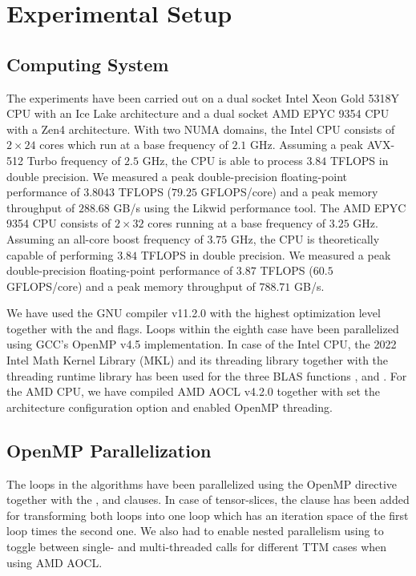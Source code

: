 \section{Experimental Setup}
\label{sec:experimental.setup}
\subsection{Computing System} 
The experiments have been carried out on a dual socket Intel Xeon Gold 5318Y CPU with an Ice Lake architecture and a dual socket AMD EPYC 9354 CPU with a Zen4 architecture.
With two NUMA domains, the Intel CPU consists of $2\times24$ cores which run at a base frequency of $2.1$ GHz.
Assuming a peak AVX-512 Turbo frequency of $2.5$ GHz, the CPU is able to process $3.84$ TFLOPS in double precision.
We measured a peak double-precision floating-point performance of $3.8043$ TFLOPS ($79.25$ GFLOPS/core) and a peak memory throughput of $288.68$ GB/s using the Likwid performance tool.
The AMD EPYC 9354 CPU consists of $2\times32$ cores running at a base frequency of $3.25$ GHz.
Assuming an all-core boost frequency of $3.75$ GHz, the CPU is theoretically capable of performing $3.84$ TFLOPS in double precision.
We measured a peak double-precision floating-point performance of $3.87$ TFLOPS ($60.5$ GFLOPS/core) and a peak memory throughput of $788.71$ GB/s.
 
We have used the GNU compiler v11.2.0 with the highest optimization level  together with the  and  flags. 
Loops within the eighth case have been parallelized using GCC's OpenMP v4.5 implementation.
In case of the Intel CPU, the 2022 Intel Math Kernel Library (MKL) and its threading library  together with the threading runtime library  has been used for the three BLAS functions ,  and .
For the AMD CPU, we have compiled AMD AOCL v4.2.0 together with set the  architecture configuration option and enabled OpenMP threading.


\subsection{OpenMP Parallelization}
The loops in the  algorithms have been parallelized using the OpenMP directive  together with the ,  and \allowbreak{} clauses.
In case of tensor-slices, the  clause has been added for transforming both loops into one loop which has an iteration space of the first loop times the second one. 
We also had to enable nested parallelism using  to toggle between single- and multi-threaded  calls for different TTM cases when using AMD AOCL.

